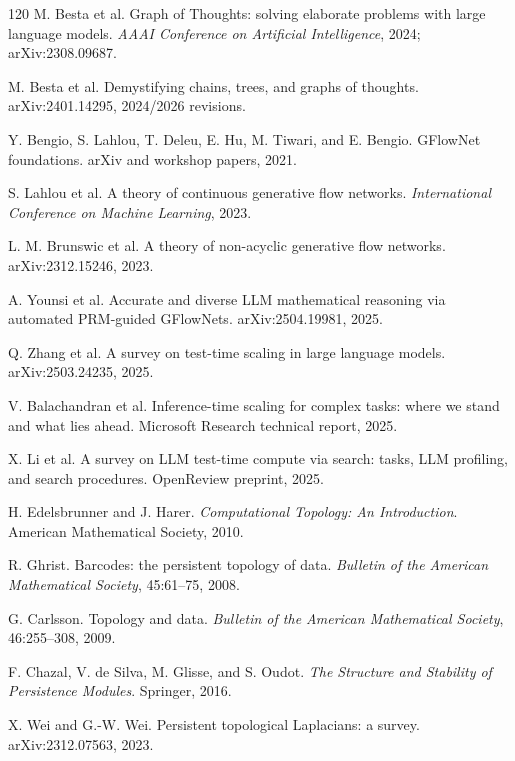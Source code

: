 \documentclass[11pt]{article}
\newcommand{\1}{\mathbf{1}}
\begin{document}
\begin{thebibliography}{120}
M. Besta et al. Graph of Thoughts: solving elaborate problems with large language models. \emph{AAAI Conference on Artificial Intelligence}, 2024; arXiv:2308.09687.

M. Besta et al. Demystifying chains, trees, and graphs of thoughts. arXiv:2401.14295, 2024/2026 revisions.

Y. Bengio, S. Lahlou, T. Deleu, E. Hu, M. Tiwari, and E. Bengio. GFlowNet foundations. arXiv and workshop papers, 2021.

S. Lahlou et al. A theory of continuous generative flow networks. \emph{International Conference on Machine Learning}, 2023.

L. M. Brunswic et al. A theory of non-acyclic generative flow networks. arXiv:2312.15246, 2023.

A. Younsi et al. Accurate and diverse LLM mathematical reasoning via automated PRM-guided GFlowNets. arXiv:2504.19981, 2025.

Q. Zhang et al. A survey on test-time scaling in large language models. arXiv:2503.24235, 2025.

V. Balachandran et al. Inference-time scaling for complex tasks: where we stand and what lies ahead. Microsoft Research technical report, 2025.

X. Li et al. A survey on LLM test-time compute via search: tasks, LLM profiling, and search procedures. OpenReview preprint, 2025.

H. Edelsbrunner and J. Harer. \emph{Computational Topology: An Introduction}. American Mathematical Society, 2010.

R. Ghrist. Barcodes: the persistent topology of data. \emph{Bulletin of the American Mathematical Society}, 45:61--75, 2008.

G. Carlsson. Topology and data. \emph{Bulletin of the American Mathematical Society}, 46:255--308, 2009.

F. Chazal, V. de Silva, M. Glisse, and S. Oudot. \emph{The Structure and Stability of Persistence Modules}. Springer, 2016.

X. Wei and G.-W. Wei. Persistent topological Laplacians: a survey. arXiv:2312.07563, 2023.


\end{thebibliography}
\end{document}
